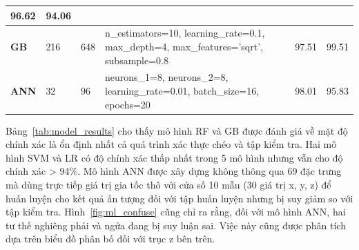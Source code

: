 \begin{table}[H]
\begin{tabular}{|l|p{1cm}|p{1cm}|p{7cm}|p{1.5cm}|p{1.5cm}|}
        96.62                                                                                                                                    & 94.06                                                                                                            \\
        \hline
        \textbf{GB}                                                                                                                              & 216                & 648              &
        \raggedright\ttfamily n\_estimators=10, learning\_rate=0.1, max\_depth=4, max\_features='sqrt', subsample=0.8                            &
        97.51                                                                                                                                    & 99.51                                                                                                            \\
        \hline
        \textbf{ANN}                                                                                                                             & 32                 & 96               &
        \raggedright\ttfamily neurons\_1=8, neurons\_2=8, learning\_rate=0.01, batch\_size=16, epochs=20                                         &
        98.01                                                                                                                                    & 95.83                                                                                                            \\
        \hline
    \end{tabular}
\end{table}

Bảng~\ref{tab:model_results} cho thấy mô hình RF và GB được đánh giá về mặt độ
chính xác là ổn định nhất cả quá trình xác thực chéo và tập kiểm tra. Hai mô
hình SVM và LR có độ chính xác thấp nhất trong 5 mô hình nhưng vẫn cho độ chính
xác > 94\%. Mô hình ANN được xây dựng không thông qua 69 đặc trưng mà dùng trực
tiếp giá trị gia tốc thô với cửa số 10 mẫu (30 giá trị x, y, z) để huấn luyện
cho kết quả ấn tượng đối với tập huấn luyện nhưng bị suy giảm so với tập kiểm
tra. Hình~\ref{fig:ml_confuse} cũng chỉ ra rằng, đối với mô hình ANN, hai tư
thế nghiêng phải và ngửa đang bị suy luận sai. Việc này cũng được phân tích dựa
trên biểu đồ phân bố đối với trục z bên trên.

